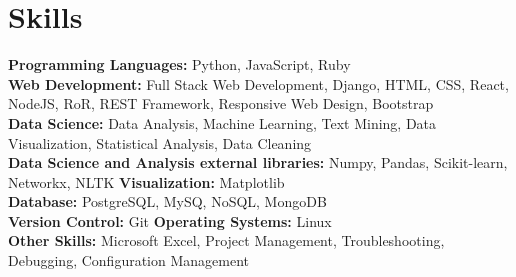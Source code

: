 \documentclass[a4paper,10pt]{article}
\begin{document}
	
	\section*{Skills}
	\textbf{Programming Languages:} Python, JavaScript, Ruby \\
	\textbf{Web Development:} Full Stack Web Development, Django, HTML, CSS, React, NodeJS, RoR, REST Framework, Responsive Web Design, Bootstrap \\
	\textbf{Data Science:} Data Analysis, Machine Learning, Text Mining, Data Visualization, Statistical Analysis, Data Cleaning \\
	\textbf{Data Science and Analysis external libraries:} Numpy, Pandas, Scikit-learn, Networkx, NLTK
	\textbf{Visualization:} Matplotlib \\
	\textbf{Database:} PostgreSQL, MySQ, NoSQL, MongoDB \\
	\textbf{Version Control:} Git  \textbf{Operating Systems:} Linux \\
	\textbf{Other Skills:} Microsoft Excel, Project Management, Troubleshooting, Debugging, Configuration Management \\

	
\end{document}
